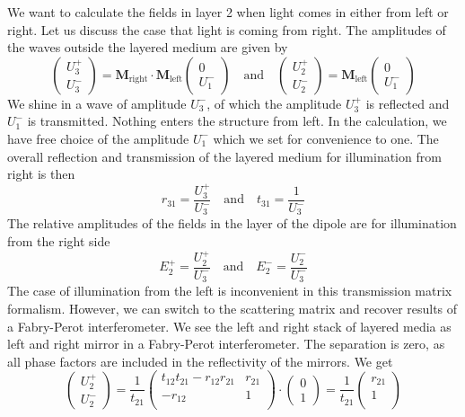 We want to calculate the fields in layer 2 when light comes in either from left or right. Let us discuss the case that light is coming from right. The amplitudes of the waves outside the layered medium are given by
\begin{equation}
\begin{pmatrix}
U_3^+ \\ U_3^-
\end{pmatrix}
= 
\mathbf{M}_\text{right} \cdot \mathbf{M}_\text{left}
\begin{pmatrix}
0 \\ U_1^-
\end{pmatrix}
\quad
\text{and}
\quad
\begin{pmatrix}
U_2^+ \\ U_2^-
\end{pmatrix}
= 
\mathbf{M}_\text{left}
\begin{pmatrix}
0 \\ U_1^-
\end{pmatrix}
\end{equation}
We shine in a wave of amplitude $U_3^-$, of which the amplitude $U_3^+$ is reflected and $ U_1^-$ is transmitted. Nothing enters the structure from left. In the calculation, we have free choice of the amplitude $U_1^-$ which we set for convenience to one. The overall reflection and transmission of the layered medium for illumination from right is then
\begin{equation}
 r_{31} = \frac{U_3^+}{U_3^-}
 \quad
 \text{and}
 \quad
 t_{31} = \frac{1}{U_3^-}
\end{equation}
The relative amplitudes of the fields in the layer of the dipole  are for illumination from the right side
\begin{equation}
E_2^+ = \frac{U_2^+}{U_3^-}
 \quad
 \text{and}
 \quad
 E_2^- = \frac{U_2^-}{U_3^-}
\end{equation}
The case of illumination from the left is inconvenient in this transmission matrix formalism. However, we can switch to the scattering matrix and recover results of a Fabry-Perot interferometer. We see the left and right stack of layered media as left and right mirror in a Fabry-Perot interferometer. The separation is zero, as all phase factors are included in the reflectivity of the mirrors. We get
\begin{equation}
\begin{pmatrix}
U_2^+ \\ U_2^-
\end{pmatrix}
=
\frac{1}{t_{21}}
\begin{pmatrix}
t_{12} t_{21} - r_{12}r_{21} & r_{21} \\ - r_{12} & 1 \\
\end{pmatrix} 
\cdot
\begin{pmatrix}
0 \\ 1
\end{pmatrix}
= 
\frac{1}{t_{21}}
\begin{pmatrix}
 r_{21} \\  1 \\
\end{pmatrix} 
\end{equation}

